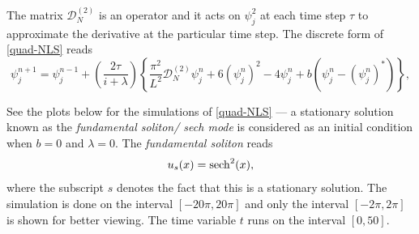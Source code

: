 \documentclass[12pt, letterpaper, twoside]{article}
\begin{document}
\newline
The matrix $\mathcal{D}_{N}^{(2)}$ is an operator and it acts on $\psi_{j}^{2}$ at each time step $\tau$ to approximate the derivative at the particular time step.
The discrete form of \eqref{quad-NLS} reads
\begin{equation}\label{discrete-quad-NLS}
    \psi_{j}^{n+1} = \psi_{j}^{n-1}  + \left(\frac{2 \tau}{i + \lambda}\right) \left\lbrace \frac{\pi^2}{L^2} \mathcal{D}^{(2)}_{N} \psi^{n}_{j} + 6 (\psi^{n}_{j})^2 - 4 \psi^{n}_{j} + b \left(\psi_{j}^{n} - (\psi_{j}^{n})^{*} \right) \right\rbrace, 
\end{equation}

 See the plots below for the simulations of \eqref{quad-NLS} --- a stationary solution known as the \textit{fundamental soliton/ sech mode } is considered as an initial condition when $b=0$ and $\lambda = 0$. The \textit{fundamental soliton} reads
\begin{equation}\label{sech-mode}
    u_s(x) = \sech^{2}(x), 
\end{equation}
where the subscript $s$ denotes the fact that this is a stationary solution.
 The simulation is done on the interval $[-20\pi, 20\pi]$ and only the interval $[-2\pi, 2\pi]$ is shown for better viewing. The time variable $t$ runs on the interval $[0, 50]$.
\end{document}
